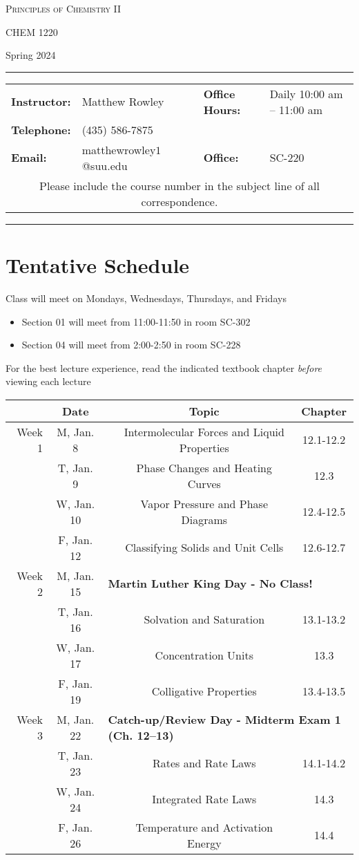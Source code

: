 \documentclass[12pt, letterpaper]{article}
\begin{document}
\begin{center}
	{\Large \textsc{Principles of Chemistry II}}
	
	CHEM 1220
\end{center}
\begin{center}
	{\large Spring 2024}
\end{center}
\begin{center}
	\rule{0.99\textwidth}{0.4pt}
	\begin{tabular}{llcll}
		\textbf{Instructor:} & Matthew Rowley & & \textbf{Office Hours:} & Daily 10:00 am -- 11:00 am \\
		\textbf{Telephone:} & (435) 586-7875 & & & \\
		\textbf{Email:} & matthewrowley$1$@suu.edu  & & \textbf{Office:} & SC-220\\
		\multicolumn{5}{c}{Please include the course number in the subject line of all correspondence.} 
	\end{tabular}
	\rule{0.99\textwidth}{0.4pt}
\end{center}

\section*{Tentative Schedule}
Class will meet on Mondays, Wednesdays, Thursdays, and Fridays
\begin{itemize}
  \item Section 01 will meet from 11:00-11:50 in room SC-302
  \item Section 04 will meet from 2:00-2:50 in room SC-228
\end{itemize}

\noindent For the best lecture experience, read the indicated textbook chapter \emph{before} viewing each lecture

\begin{tabular}{rcccc}
& Date && Topic & Chapter\\
\midrule
Week 1 & M, Jan. 8&& Intermolecular Forces and Liquid Properties & 12.1-12.2\\
& T, Jan. 9&& Phase Changes and Heating Curves & 12.3\\
& W, Jan. 10&& Vapor Pressure and Phase Diagrams & 12.4-12.5\\
& F, Jan. 12&& Classifying Solids and Unit Cells & 12.6-12.7\\
\midrule
Week 2 & M, Jan. 15& \multicolumn{3}{l}{\textbf{Martin Luther King Day - No Class!}}\\
& T, Jan. 16&& Solvation and Saturation & 13.1-13.2\\
& W, Jan. 17&& Concentration Units & 13.3\\
& F, Jan. 19&& Colligative Properties & 13.4-13.5\\
\midrule
Week 3 & M, Jan. 22& \multicolumn{3}{l}{\textbf{Catch-up/Review Day - Midterm Exam 1 (Ch. 12--13)}}\\
& T, Jan. 23&& Rates and Rate Laws & 14.1-14.2\\
& W, Jan. 24&& Integrated Rate Laws & 14.3\\
& F, Jan. 26&& Temperature and Activation Energy & 14.4\\
\end{tabular}
\end{document}
